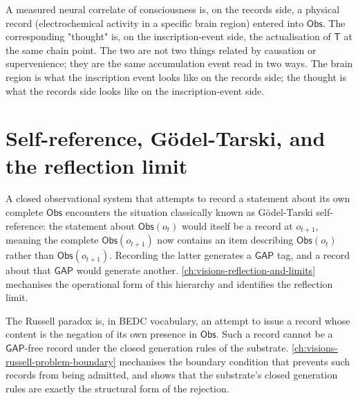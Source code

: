 \begin{example}
\label{ex:hard-problems-neural-correlate}
A measured neural correlate of consciousness is, on the records side, a physical record (electrochemical activity in a specific brain region) entered into $\mathsf{Obs}$. The corresponding "thought" is, on the inscription-event side, the actualisation of $\mathsf{T}$ at the same chain point. The two are not two things related by causation or supervenience; they are the same accumulation event read in two ways. The brain region is what the inscription event looks like on the records side; the thought is what the records side looks like on the inscription-event side.
\end{example}

\section{Self-reference, G\"{o}del-Tarski, and the reflection limit}
\label{sec:hard-problems-self-reference}

\begin{principle}
\label{prin:hard-problems-self-reference-as-gap-on-gap}
A closed observational system that attempts to record a statement about its own complete $\mathsf{Obs}$ encounters the situation classically known as G\"{o}del-Tarski self-reference: the statement about $\mathsf{Obs}(o_t)$ would itself be a record at $o_{t+1}$, meaning the complete $\mathsf{Obs}(o_{t+1})$ now contains an item describing $\mathsf{Obs}(o_t)$ rather than $\mathsf{Obs}(o_{t+1})$. Recording the latter generates a $\mathsf{GAP}$ tag, and a record about that $\mathsf{GAP}$ would generate another. \autoref{ch:visions-reflection-and-limits} mechanises the operational form of this hierarchy and identifies the reflection limit.
\end{principle}

\begin{principle}
\label{prin:hard-problems-russell-as-paradox-boundary}
The Russell paradox is, in BEDC vocabulary, an attempt to issue a record whose content is the negation of its own presence in $\mathsf{Obs}$. Such a record cannot be a $\mathsf{GAP}$-free record under the closed generation rules of the substrate. \autoref{ch:visions-russell-problem-boundary} mechanises the boundary condition that prevents such records from being admitted, and shows that the substrate's closed generation rules are exactly the structural form of the rejection.
\end{principle}

